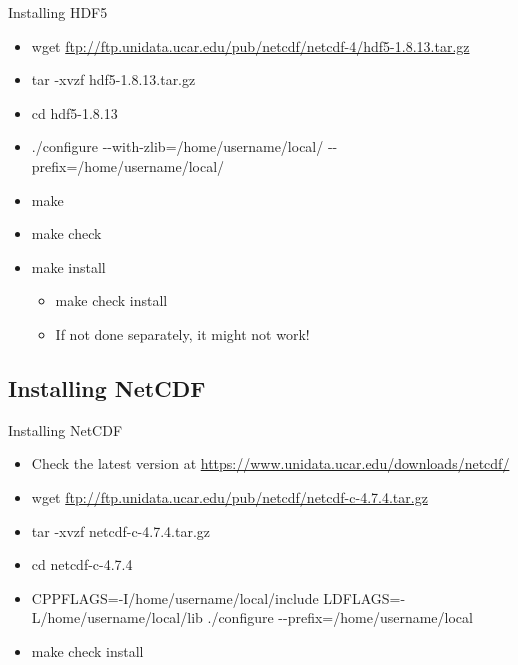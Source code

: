\documentclass[compress,11pt,xcolor=svgnames,aspectratio=169]{beamer}
\begin{document}
\begin{frame}[fragile]{Installing HDF5}

\begin{itemize}
\setlength\itemsep{0.3cm}

  \item wget \url{ftp://ftp.unidata.ucar.edu/pub/netcdf/netcdf-4/hdf5-1.8.13.tar.gz}
  \item tar -xvzf hdf5-1.8.13.tar.gz
  \item cd hdf5-1.8.13
  \item ./configure {-}{-}with-zlib=/home/username/local/ {-}{-}prefix=/home/username/local/
  \item make
  \item make check
  \item make install
  \begin{itemize}
    \item make check install
    \item If not done separately, it might not work!
  \end{itemize}
\end{itemize}

\end{frame}

\subsection{Installing NetCDF}

\begin{frame}[fragile]{Installing NetCDF}

\begin{itemize}
\setlength\itemsep{0.3cm}

  \item Check the latest version at \url{https://www.unidata.ucar.edu/downloads/netcdf/}
  \item wget \url{ftp://ftp.unidata.ucar.edu/pub/netcdf/netcdf-c-4.7.4.tar.gz}
  \item tar -xvzf netcdf-c-4.7.4.tar.gz
  \item cd netcdf-c-4.7.4
  \item CPPFLAGS=-I/home/username/local/include LDFLAGS=-L/home/username/local/lib ./configure {-}{-}prefix=/home/username/local
  \item make check install

\end{itemize}

\end{frame}
\end{document}
